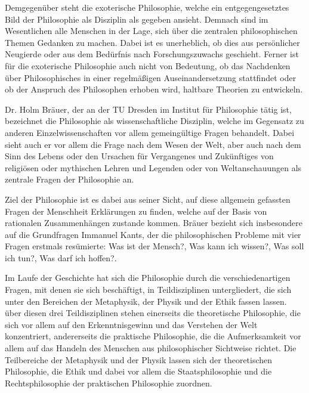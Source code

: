 Demgegenüber steht die exoterische Philosophie, welche ein entgegengesetztes Bild der Philosophie als Disziplin als gegeben ansieht. 
Demnach sind im Wesentlichen alle Menschen in der Lage, sich über die zentralen philosophischen Themen Gedanken zu machen. 
Dabei ist es unerheblich, ob dies aus persönlicher Neugierde oder aus dem Bedürfnis nach Forschungszuwachs geschieht. 
Ferner ist für die exoterische Philosophie auch nicht von Bedeutung, ob das Nachdenken über Philosophisches in einer regelmäßigen Auseinandersetzung stattfindet oder ob der Anspruch des Philosophen erhoben wird, haltbare Theorien zu entwickeln\cite{BB10, S.8}.

Dr. Holm Bräuer, der an der TU Dresden im Institut für Philosophie tätig ist, bezeichnet die Philosophie als wissenschaftliche Disziplin, welche im Gegensatz zu anderen Einzelwissenschaften vor allem gemeingültige Fragen behandelt.
 Dabei sieht auch er vor allem die Frage nach dem Wesen der Welt, aber auch nach dem Sinn des Lebens oder den Ursachen für \glqq Vergangenes und Zukünftiges von religiösen oder mythischen Lehren und Legenden oder von Weltanschauungen\grqq{}\cite{PL16} als zentrale Fragen der Philosophie an.

 Ziel der Philosophie ist es dabei aus seiner Sicht, auf diese allgemein gefassten Fragen der Menschheit Erklärungen zu finden, welche auf der Basis von rationalen Zusammenhängen zustande kommen.
  Bräuer bezieht sich insbesondere auf die Grundfragen Immanuel Kants, der die philosophischen Probleme mit vier Fragen erstmals resümierte: \glqq Was ist der Mensch?\grqq{}, \glqq Was kann ich wissen?\grqq{}, \glqq Was soll ich tun?\grqq{}, \glqq Was darf ich hoffen?\grqq{}.  
  
Im Laufe der Geschichte hat sich die Philosophie durch die verschiedenartigen Fragen, mit denen sie sich beschäftigt, in Teildisziplinen untergliedert, die sich unter den Bereichen der Metaphysik, der Physik und der Ethik fassen lassen. 
über diesen drei Teildisziplinen stehen einerseits die theoretische Philosophie, die sich vor allem auf den Erkenntnisgewinn und das Verstehen der Welt konzentriert, andererseits die praktische Philosophie, die die Aufmerksamkeit vor allem auf das Handeln des Menschen aus philosophischer Sichtweise richtet. 
Die Teilbereiche der Metaphysik und der Physik lassen sich der theoretischen Philosophie, die Ethik und dabei vor allem die Staatsphilosophie und die Rechtsphilosophie der praktischen Philosophie zuordnen. 

